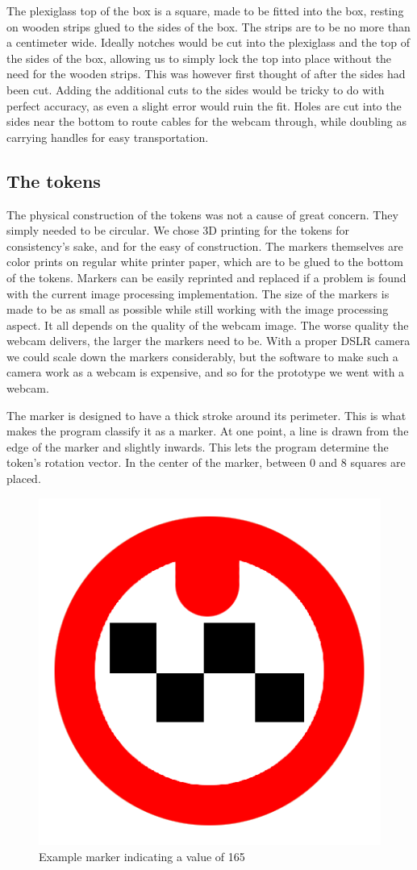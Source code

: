 The plexiglass top of the box is a square, made to be fitted into the box, resting on wooden strips glued to the sides of the box. The strips are to be no more than a centimeter wide. Ideally notches would be cut into the plexiglass and the top of the sides of the box, allowing us to simply lock the top into place without the need for the wooden strips. This was however first thought of after the sides had been cut. Adding the additional cuts to the sides would be tricky to do with perfect accuracy, as even a slight error would ruin the fit. 
Holes are cut into the sides near the bottom to route cables for the webcam through, while doubling as carrying handles for easy transportation. 

\subsection{The tokens}

The physical construction of the tokens was not a cause of great concern. They simply needed to be circular. We chose 3D printing for the tokens for consistency's sake, and for the easy of construction. The markers themselves are color prints on regular white printer paper, which are to be glued to the bottom of the tokens. Markers can be easily reprinted and replaced if a problem is found with the current image processing implementation. 
The size of the markers is made to be as small as possible while still working with the image processing aspect. It all depends on the quality of the webcam image. The worse quality the webcam delivers, the larger the markers need to be. With a proper DSLR camera we could scale down the markers considerably, but the software to make such a camera work as a webcam is expensive, and so for the prototype we went with a webcam.

The marker is designed to have a thick stroke around its perimeter. This is what makes the program classify it as a marker. At one point, a line is drawn from the edge of the marker and slightly inwards. This lets the program determine the token's rotation vector. In the center of the marker, between 0 and 8 squares are placed.
\begin{figure}[H]
	\centering
	\includegraphics[width=0.3\linewidth]{figure/Analysis/circleexample2}
	\caption{Example marker indicating a value of 165}
	\label{fig:circle2}
\end{figure}

